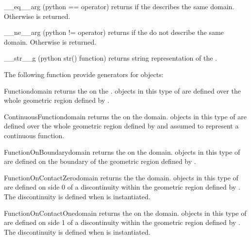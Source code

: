 \begin{methoddesc}[FunctionSpace]{__eq__}{arg}
(python == operator) returns \True if the \Domain {} describes the same domain. Otherwise
\False is returned.
\end{methoddesc}

\begin{methoddesc}[FunctionSpace]{__ne__}{arg}
(python != operator) returns \True if the \Domain {} do not describe the same domain. 
Otherwise \False is returned.
\end{methoddesc}

\begin{methoddesc}[Domain]{__str__}{g}
(python str() function) returns string representation of the \Domain.
\end{methoddesc}

The following function provide generators for \FunctionSpace objects:
\begin{funcdesc}{Function}{domain}
returns the \Function on the \Domain {}. \Data objects in this type of \Function
are defined over the whole geometric region defined by . 
\end{funcdesc}

\begin{funcdesc}{ContinuousFunction}{domain}
returns the \ContinuousFunction on the \Domain domain. \Data objects in this type of \Function
are defined over the whole geometric region defined by  and assumed to represent
a continuous function.
\end{funcdesc}

\begin{funcdesc}{FunctionOnBoundary}{domain}
returns the \ContinuousFunction on the \Domain domain. \Data objects in this type of \Function
are defined on the boundary of the geometric region defined by . 
\end{funcdesc}

\begin{funcdesc}{FunctionOnContactZero}{domain}
returns the \FunctionOnContactZero the \Domain domain. \Data objects in this type of \Function
are defined on side 0 of a discontinuity  within the geometric region defined by .
The discontinuity is defined when  is instantiated.
\end{funcdesc}

\begin{funcdesc}{FunctionOnContactOne}{domain}
returns the \FunctionOnContactOne on the \Domain domain. 
\Data objects in this type of \Function
are defined on side 1 of a discontinuity  within the geometric region defined by .
The discontinuity is defined when  is instantiated.
\end{funcdesc}


